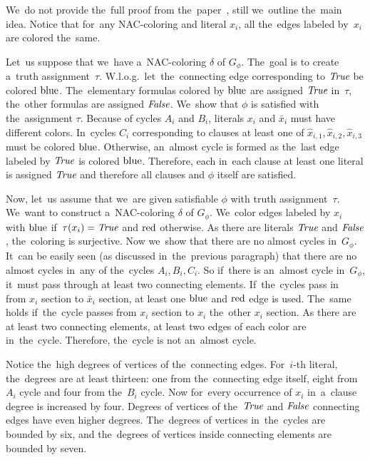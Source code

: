 We~do not provide the~full proof from the~paper~\cite{np_complete},
still we~outline the~main idea.
Notice that for~any NAC-coloring and literal \( x_i \),
all the~edges labeled by~\( x_i \) are colored the~same.

Let~us suppose that we~have a~NAC-coloring \( \delta \) of \( G_\phi \).
The~goal is to create a~truth assignment~\( \tau \).
W.l.o.g.\ let~the~connecting edge corresponding to \( \textit{True} \) be colored \( \text{blue} \).
The~elementary formulas colored by \( \text{blue} \) are assigned \( \textit{True} \) in~\( \tau \),
the~other formulas are assigned \( \textit{False} \).
We~show that \( \phi \) is satisfied with the~assignment \( \tau \).
Because of cycles \( A_i \) and \( B_i \), literals \( x_i \) and \( \bar{x}_i \)
must have different colors. In~cycles \( C_i \) corresponding to clauses
at least one of \( \hat{x}_{i,1}, \hat{x}_{i,2}, \hat{x}_{i,3} \) must be colored \( \text{blue} \).
Otherwise, an~almost cycle is formed as the~last edge labeled by \( \textit{True} \) is colored \( \text{blue} \).
Therefore, each in~each clause at least one literal is assigned \( \textit{True} \)
and therefore all clauses and \( \phi \) itself are satisfied.

Now, let~us assume that we~are given satisfiable \( \phi \)
with truth assignment~\( \tau \).
We~want to construct a~NAC-coloring \( \delta \) of \( G_\phi \).
We~color edges labeled by \( x_i \) with \( \text{blue} \) if~\( \tau(x_i) = \textit{True} \)
and \( \text{red} \) otherwise.
As there are literals \( \textit{True} \) and \( \textit{False} \), the~coloring is surjective.
Now we~show that there are no almost cycles in~\( G_\phi \).
It~can be easily seen (as discussed in~the~previous paragraph)
that there are no almost cycles in~any of the~cycles \( A_i, B_i, C_i \).
So if~there is an~almost cycle in~\( G_\phi \), it~must pass through
at least two connecting elements.
If~the~cycles pass in~
from \( x_i \) section to \( \bar{x}_i \) section, at least one \( \text{blue} \)
and \( \text{red} \) edge is used. The~same holds if~the~cycle passes
from \( x_i \) section to \( x_i \) the~other \( x_i \) section.
As there are at least two connecting elements, at least two edges of each color are in~the~cycle.
Therefore, the~cycle is not an~almost cycle.

Notice the~high degrees of vertices of the~connecting edges.
For~\( i \)-th literal, the~degrees are at least thirteen:
one from the~connecting edge itself,
eight from \( A_i \) cycle and four from the~\( B_i \) cycle.
Now for~every occurrence of \( x_i \) in~a~clause degree is increased by four.
%
Degrees of vertices of the~\( \textit{True} \) and \( \textit{False} \) connecting edges
have even higher degrees.
%
The~degrees of vertices in~the~cycles are bounded by six,
and the~degrees of vertices inside connecting elements are bounded by seven.



